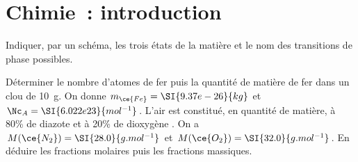 \documentclass[a4paper, 10pt, final, garamond]{book}
\begin{document}
\setcounter{chapter}{6}

\chapter{Chimie~: introduction}

\begin{enumerate}[label=\sqenumi, leftmargin=10pt]
%
  Indiquer, par un schéma, les trois états de la matière et le nom des
  transitions de phase possibles.
  \begin{center}
  \end{center}
  Déterminer le nombre d'atomes de fer puis la quantité de matière de
  fer dans un clou de \SI{10}{g}. On donne $m_{\ce{Fe}} = \SI{9.37e-26}{kg}$ et
  $\Nc_A = \SI{6.022e23}{mol^{-1}}$.
  \smallbreak
  \vspace{-15pt}
  L'air est constitué, en quantité de matière, à 80\% de diazote  et
	à 20\% de dioxygène .
	\smallbreak
	On a
	$M(\ce{N_2}) = \SI{28.0}{g.mol^{-1}}$ et
	$M(\ce{O_2}) = \SI{32.0}{g.mol^{-1}}$.
	\smallbreak
	En déduire les fractions molaires puis les fractions massiques.
	\smallbreak
	\begin{isd}
\end{isd}
\end{enumerate}
\end{document}

